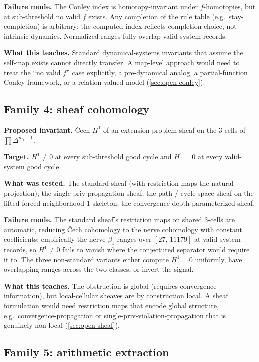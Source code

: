 \documentclass[11pt,a4paper]{article}
\theoremstyle{plain}
\theoremstyle{definition}
\begin{document}
\textbf{Failure mode.} The Conley index is homotopy-invariant under
$f$-homotopies, but at sub-threshold no valid $f$ exists.  Any
completion of the rule table (e.g.\ stay-completion) is arbitrary; the
computed index reflects completion choice, not intrinsic dynamics.
Normalized ranges fully overlap valid-system records.

\textbf{What this teaches.} Standard dynamical-systems invariants that
assume the self-map exists cannot directly transfer.  A map-level
approach would need to treat the ``no valid $f$'' case explicitly,
a pre-dynamical analog, a partial-function Conley framework, or a
relation-valued model (\cref{sec:open-conley}).

\subsection{Family 4: sheaf cohomology}\label{sec:landscape-sheaf}

\textbf{Proposed invariant.} \v{C}ech $H^1$ of an extension-problem
sheaf on the $3$-cells of $\prod \Delta^{m_i - 1}$.

\textbf{Target.} $H^1 \ne 0$ at every sub-threshold good cycle and
$H^1 = 0$ at every valid-system good cycle.

\textbf{What was tested.} The standard sheaf (with restriction maps
the natural projection); the single-priv-propagation sheaf; the
path / cycle-space sheaf on the lifted forced-neighborhood
$1$-skeleton; the convergence-depth-parameterized sheaf.

\textbf{Failure mode.} The standard sheaf's restriction maps on shared
$3$-cells are automatic, reducing \v{C}ech cohomology to the nerve
cohomology with constant coefficients; empirically the nerve
$\beta_1$ ranges over $[27,\, 11179]$ at valid-system records, so
$H^1 \ne 0$ fails to vanish where the conjectured separator would
require it to.  The
three non-standard variants either compute $H^1 = 0$ uniformly, have
overlapping ranges across the two classes, or invert the signal.

\textbf{What this teaches.} The obstruction is global (requires
convergence information), but local-cellular sheaves are by
construction local.  A sheaf formulation would need restriction maps
that encode global structure, e.g.\ convergence-propagation or
single-priv-violation-propagation that is genuinely non-local
(\cref{sec:open-sheaf}).

\subsection{Family 5: arithmetic extraction}\label{sec:landscape-arith}
\end{document}
